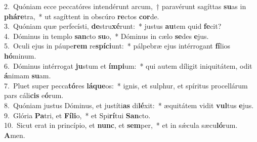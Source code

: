 {2.~}Quóniam ecce peccatóres intendérunt arcum,~† paravérunt sagíttas \textbf{su}as in \textbf{phá}\textbf{re}tra,~* ut sagíttent in obscúro \textbf{re}ctos \textbf{cor}de.\\
{3.~}Quóniam quæ perfecísti, \textbf{de}stru\textbf{xé}runt:~* justus \textbf{au}tem quid \textbf{fe}cit?\\
{4.~}Dóminus in templo \textbf{san}cto \textbf{su}o,~* Dóminus in cælo \textbf{se}des \textbf{e}jus.\\
{5.~}Oculi ejus in páupe\textbf{rem} re\textbf{spí}\textbf{ci}unt:~* pálpebræ ejus intérrogant \textbf{fí}lios \textbf{hó}minum.\\
{6.~}Dóminus intérrogat \textbf{ju}stum et \textbf{ím}\textbf{pi}um:~* qui autem díligit iniquitátem, odit \textbf{á}nimam \textbf{su}am.\\
{7.~}Pluet super pecca\textbf{tó}res \textbf{lá}\textbf{que}os:~* ignis, et sulphur, et spíritus procellárum pars cáli\textbf{cis} e\textbf{ó}rum.\\
{8.~}Quóniam justus Dóminus, et justíti\textbf{as} di\textbf{lé}xit:~* æquitátem vidit \textbf{vul}tus \textbf{e}jus.\\
{9.~}Glória \textbf{Pa}tri, et \textbf{Fí}\textbf{li}o,~* et Spi\textbf{rí}tui \textbf{San}cto.\\
{10.~}Sicut erat in princípio, et \textbf{nunc}, et \textbf{sem}per,~* et in sǽcula sæcu\textbf{ló}rum. \textbf{A}men.\\
